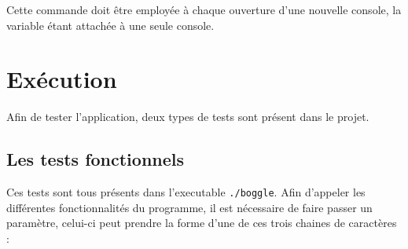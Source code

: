 \documentclass[12pt,a4paper,openany]{book}
\begin{document}
	Cette commande doit être employée à chaque ouverture d'une nouvelle console, la variable étant attachée à une seule console.  

	\section{Exécution}
	Afin de tester l'application, deux types de tests sont présent dans le projet.

		\subsection{Les tests fonctionnels} Ces tests sont tous présents dans l'executable
			\texttt{./boggle}. Afin d'appeler les différentes fonctionnalités du programme, il
			est nécessaire de faire passer un paramètre, celui-ci peut prendre la forme d'une
			de ces trois chaines de caractères : 
\end{document}
